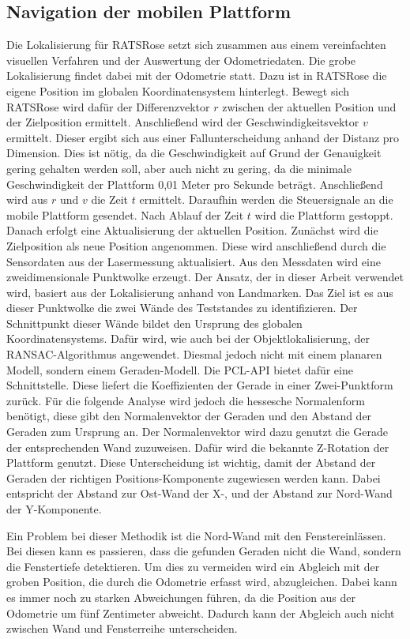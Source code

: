 \subsection{Navigation der mobilen Plattform}
\label{sec:impl-lopo}
Die Lokalisierung für RATSRose setzt sich zusammen aus einem vereinfachten visuellen Verfahren und der Auswertung der Odometriedaten. Die grobe Lokalisierung findet dabei mit der Odometrie statt. Dazu ist in RATSRose die eigene Position im globalen Koordinatensystem hinterlegt. Bewegt sich RATSRose wird dafür der Differenzvektor $r$ zwischen der aktuellen Position und der Zielposition ermittelt. Anschließend wird der Geschwindigkeitsvektor $v$ ermittelt. Dieser ergibt sich aus einer Fallunterscheidung anhand der Distanz pro Dimension. Dies ist nötig, da die Geschwindigkeit auf Grund der Genauigkeit gering gehalten werden soll, aber auch nicht zu gering, da die minimale Geschwindigkeit der Plattform 0,01 Meter pro Sekunde beträgt. Anschließend wird aus $r$ und $v$ die Zeit $t$ ermittelt. Daraufhin werden die Steuersignale an die mobile Plattform gesendet. Nach Ablauf der Zeit $t$ wird die Plattform gestoppt. Danach erfolgt eine Aktualisierung der aktuellen Position. Zunächst wird die Zielposition als neue Position angenommen. Diese wird anschließend durch die Sensordaten aus der Lasermessung aktualisiert. Aus den Messdaten wird eine zweidimensionale Punktwolke erzeugt. Der Ansatz, der in dieser Arbeit verwendet wird, basiert aus der Lokalisierung anhand von Landmarken. Das Ziel ist es aus dieser Punktwolke die zwei Wände des Teststandes zu identifizieren. Der Schnittpunkt dieser Wände bildet den Ursprung des globalen Koordinatensystems. Dafür wird, wie auch bei der Objektlokalisierung, der RANSAC-Algorithmus angewendet. Diesmal jedoch nicht mit einem planaren Modell, sondern einem Geraden-Modell. Die PCL-API bietet dafür eine Schnittstelle. Diese liefert die Koeffizienten der Gerade in einer Zwei-Punktform zurück. Für die folgende Analyse wird jedoch die hessesche Normalenform benötigt, diese gibt den Normalenvektor der Geraden und den Abstand der Geraden zum Ursprung an. Der Normalenvektor wird dazu genutzt die Gerade der entsprechenden Wand zuzuweisen. Dafür wird die bekannte Z-Rotation der Plattform genutzt. Diese Unterscheidung ist wichtig, damit der Abstand der Geraden der richtigen Positions-Komponente zugewiesen werden kann. Dabei entspricht der Abstand zur Ost-Wand der X-, und der Abstand zur Nord-Wand der Y-Komponente.

Ein Problem bei dieser Methodik ist die Nord-Wand mit den Fenstereinlässen. Bei diesen kann es passieren, dass die gefunden Geraden nicht die Wand, sondern die Fenstertiefe detektieren. Um dies zu vermeiden wird ein Abgleich mit der groben Position, die durch die Odometrie erfasst wird, abzugleichen. Dabei kann es immer noch zu starken Abweichungen führen, da die Position aus der Odometrie um fünf Zentimeter abweicht. Dadurch kann der Abgleich auch nicht zwischen Wand und Fensterreihe unterscheiden.

